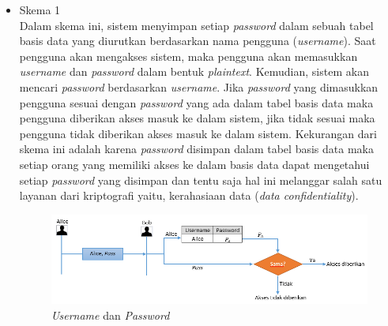 \begin{itemize}
	\item Skema 1\\
	Dalam skema ini, sistem menyimpan setiap \textit{password} dalam sebuah tabel basis data yang diurutkan berdasarkan nama pengguna (\textit{username}). Saat pengguna akan mengakses sistem, maka pengguna akan memasukkan \textit{username} dan \textit{password} dalam bentuk \textit{plaintext}. Kemudian, sistem akan mencari \textit{password} berdasarkan \textit{username}. Jika \textit{password} yang dimasukkan pengguna sesuai dengan \textit{password} yang ada dalam tabel basis data maka pengguna diberikan akses masuk ke dalam sistem, jika tidak sesuai maka pengguna tidak diberikan akses masuk ke dalam sistem. Kekurangan dari skema ini adalah karena \textit{password} disimpan dalam tabel basis data maka setiap orang yang memiliki akses ke dalam basis data dapat mengetahui setiap \textit{password} yang disimpan dan tentu saja hal ini melanggar salah satu layanan dari kriptografi yaitu, kerahasiaan data (\textit{data confidentiality}).
	\begin{figure}[H]
		\includegraphics[scale=0.7]{Gambar/password_1}
		\centering
		\caption{\textit{Username} dan \textit{Password}}
	\end{figure}
	

\end{itemize}

